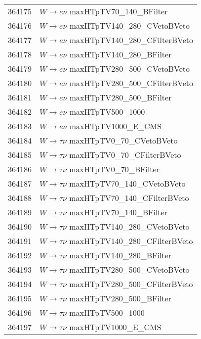 \documentclass[14pt, a4paper]{book}
\begin{document}
\begin{table}[!h]
\begin{tabular}{c|l}
        364175                  & $W\rightarrow e\nu$ maxHTpTV70\_140\_BFilter\\
        364176                  & $W\rightarrow e\nu$ maxHTpTV140\_280\_CVetoBVeto\\
        364177                  & $W\rightarrow e\nu$ maxHTpTV140\_280\_CFilterBVeto\\
        364178                  & $W\rightarrow e\nu$ maxHTpTV140\_280\_BFilter\\
        364179                  & $W\rightarrow e\nu$ maxHTpTV280\_500\_CVetoBVeto\\
        364180                  & $W\rightarrow e\nu$ maxHTpTV280\_500\_CFilterBVeto\\
        364181                  & $W\rightarrow e\nu$ maxHTpTV280\_500\_BFilter\\
        364182                  & $W\rightarrow e\nu$ maxHTpTV500\_1000\\
        364183                  & $W\rightarrow e\nu$ maxHTpTV1000\_E\_CMS\\
        364184                  & $W\rightarrow \tau\nu$ maxHTpTV0\_70\_CVetoBVeto\\
        364185                  & $W\rightarrow \tau\nu$ maxHTpTV0\_70\_CFilterBVeto\\
        364186                  & $W\rightarrow \tau\nu$ maxHTpTV0\_70\_BFilter\\
        364187                  & $W\rightarrow \tau\nu$ maxHTpTV70\_140\_CVetoBVeto\\
        364188                  & $W\rightarrow \tau\nu$ maxHTpTV70\_140\_CFilterBVeto\\
        364189                  & $W\rightarrow \tau\nu$ maxHTpTV70\_140\_BFilter\\
        364190                  & $W\rightarrow \tau\nu$ maxHTpTV140\_280\_CVetoBVeto\\
        364191                  & $W\rightarrow \tau\nu$ maxHTpTV140\_280\_CFilterBVeto\\
        364192                  & $W\rightarrow \tau\nu$ maxHTpTV140\_280\_BFilter\\
        364193                  & $W\rightarrow \tau\nu$ maxHTpTV280\_500\_CVetoBVeto\\
        364194                  & $W\rightarrow \tau\nu$ maxHTpTV280\_500\_CFilterBVeto\\
        364195                  & $W\rightarrow \tau\nu$ maxHTpTV280\_500\_BFilter\\
        364196                  & $W\rightarrow \tau\nu$ maxHTpTV500\_1000\\
        364197                  & $W\rightarrow \tau\nu$ maxHTpTV1000\_E\_CMS\\
        \midrule\midrule
    \end{tabular}
    \label{tab:W_DSID}
\end{table}
\end{document}
